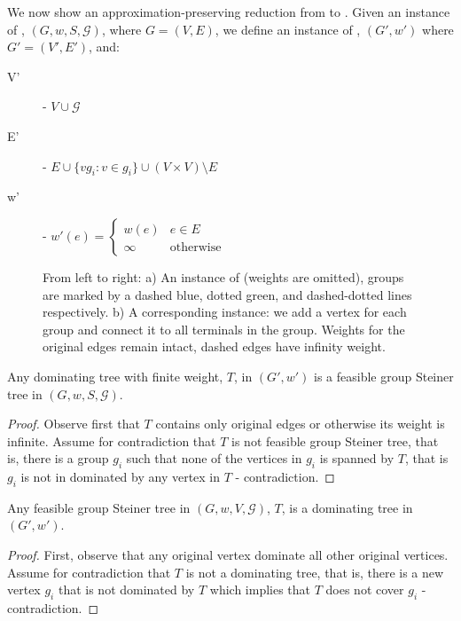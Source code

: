 We now show an approximation-preserving reduction from \ProbGroup{} to
\Prob{}.
Given an instance of \ProbGroup{}, $(G, w, S, \mathcal{G})$, where $G = (V, E)$, 
we define an instance of \Prob{},
$(G', w')$ where $G' = (V', E')$, and:
\begin{description}
\item[V'] - $V \cup \mathcal{G}$
\item[E'] - $E \cup \{vg_i : v \in g_i\} \cup (V \times V) \setminus E$
\item[w'] - $
w'(e) = 
\begin{cases}
w(e) 	& e \in E
\\
\infty & \text{otherwise}
\end{cases}
$
\end{description}


\begin{figure}
\begin{center}

\end{center}
\caption{\label{fig:prob-geq-group}
From left to right:
a) An instance of \ProbGroup{} (weights are omitted), 
groups are marked by a dashed blue, dotted green, and dashed-dotted lines respectively.  
b) A corresponding \Prob{} instance: we add a vertex for each group and connect it 
to all terminals in the group.
Weights for the original edges remain intact, dashed edges have infinity weight.   
}
\end{figure}

\begin{claim}
Any dominating tree with finite weight, $T$, in $(G', w')$ is a feasible group Steiner tree in 
$(G, w, S, \mathcal{G})$.
\end{claim}

\begin{proof}
Observe first that $T$ contains only original edges or otherwise its weight is infinite.  
Assume for contradiction that $T$ is not feasible group Steiner tree, that is, there is 
a group $g_i$ such that none of the vertices in $g_i$ is spanned by $T$, that is $g_i$
is not in dominated by any vertex in $T$ - contradiction. 
\end{proof}
 
\begin{claim}
Any feasible group Steiner tree in $(G, w, V, \mathcal{G})$, $T$, is a dominating tree
in $(G', w')$.
\end{claim}

\begin{proof}
First, observe that any original vertex dominate all other original vertices.
Assume for contradiction that $T$ is not a dominating tree, that is, there is 
a new vertex $g_i$ that is not dominated by $T$ which implies that 
$T$ does not cover $g_i$ - contradiction. 
\end{proof}